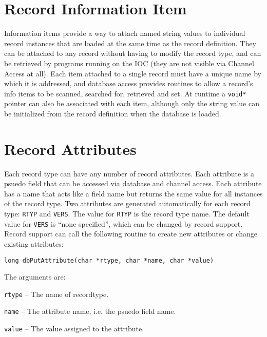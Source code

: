 \section{Record Information Item}
\label{Record Information Item}

Information items provide a way to attach named string values to individual record instances that are loaded at the same time as the record definition.
They can be attached to any record without having to modify the record type, and can be retrieved by programs running on the IOC (they are not visible via Channel Access at all).
Each item attached to a single record must have a unique name by which it is addressed, and database access provides routines to allow a record's info items to be scanned, searched for, retrieved and set.
At runtime a \verb|void*| pointer can also be associated with each item, although only the string value can be initialized from the record definition when the database is loaded.

\section{Record Attributes}

Each record type can have any number of record attributes.
Each attribute is a psuedo field that can be accessed via database and channel access.
Each attribute has a name that acts like a field name but returns the same value for all instances of the record type.
Two attributes are generated automatically for each record type: \verb|RTYP| and \verb|VERS|.
The value for \verb|RTYP| is the record type name.
The default value for \verb|VERS| is ``none specified'', which can be changed by record support.
Record support can call the following routine to create new attributes or change existing attributes:

\begin{verbatim}
long dbPutAttribute(char *rtype, char *name, char *value)
\end{verbatim}

The arguments are:

\begin{description}
\item \verb|rtype| -- The name of recordtype.
\item \verb|name| -- The attribute name, i.e. the psuedo field name.
\item \verb|value| -- The value assigned to the attribute.
\end{description}

